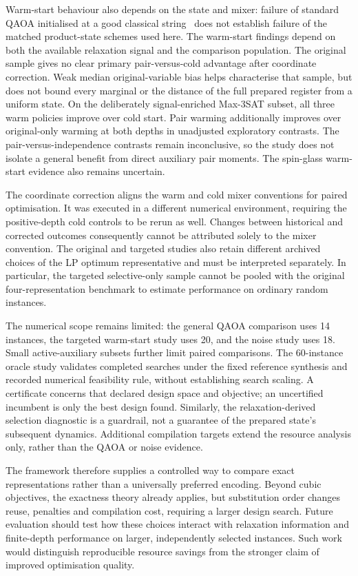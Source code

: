 \documentclass[a4paper,onecolumn,11pt,unpublished]{quantumarticle}
\theoremstyle{remark}
\begin{document}
Warm-start behaviour also depends on the state and mixer: failure of
standard QAOA initialised at a good classical string~\cite{Cain2023}
does not establish failure of the matched product-state schemes used here.
The warm-start findings depend on both the available relaxation signal and
the comparison population. The original sample gives no clear primary
pair-versus-cold advantage after coordinate correction. Weak median
original-variable bias helps characterise that sample, but does not bound
every marginal or the distance of the full prepared register from a uniform
state. On the deliberately signal-enriched Max-3SAT subset, all three warm
policies improve over cold start. Pair warming additionally improves over
original-only warming at both depths in unadjusted exploratory contrasts.
The pair-versus-independence contrasts remain inconclusive, so the study does
not isolate a general benefit from direct auxiliary pair moments. The
spin-glass warm-start evidence also remains uncertain.

The coordinate correction aligns the warm and cold mixer conventions for
paired optimisation. It was executed in a different numerical environment,
requiring the positive-depth cold controls to be rerun as well. Changes
between historical and corrected outcomes consequently cannot be attributed
solely to the mixer convention. The original and targeted studies also
retain different archived choices of the LP optimum representative and
must be interpreted separately. In particular, the targeted selective-only
sample cannot be pooled with the original four-representation benchmark
to estimate performance on ordinary random instances.

The numerical scope remains limited: the general QAOA comparison uses
14 instances, the targeted warm-start study uses 20, and the noise study
uses 18. Small active-auxiliary subsets further limit paired comparisons.
The 60-instance oracle study validates completed searches under the fixed
reference synthesis and recorded numerical feasibility rule, without
establishing search scaling. A certificate concerns that declared design
space and objective; an uncertified incumbent is only the best design
found. Similarly, the relaxation-derived selection diagnostic is a
guardrail, not a guarantee of the prepared state's subsequent dynamics.
Additional compilation targets extend the resource analysis only, rather
than the QAOA or noise evidence.

The framework therefore supplies a controlled way to compare exact
representations rather than a universally preferred encoding. Beyond
cubic objectives, the exactness theory already applies, but substitution
order changes reuse, penalties and compilation cost, requiring a larger
design search. Future evaluation should test how these choices interact
with relaxation information and finite-depth performance on larger,
independently selected instances. Such work would distinguish reproducible
resource savings from the stronger claim of improved optimisation quality.
\end{document}
